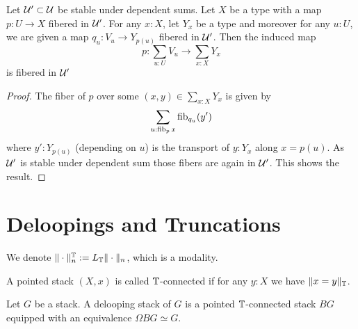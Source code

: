 \documentclass{article}
\begin{document}
\begin{lemma}{\label{lemma:AtlasSum}}
	Let $\mathcal{U}' \subset \mathcal{U}$ be stable under dependent sums.
	Let $X$ be a type with a  map $p : U \to X$ fibered in $\mathcal{U}'$.  For any $x : X$, let $Y_x$ be a type and moreover for any $u : U$, we are given a map $q_u : V_u \to Y_{p(u)}$ fibered in $\mathcal{U}'$. Then the induced map
	\[
	p : \sum_{u : U} V_u \to \sum_{x : X} Y_{x}
	\]
	is fibered in $\mathcal{U}'$
\end{lemma}
\begin{proof}
	The fiber of $p$ over some $(x,y) \in \sum_{x :X} Y_x$ is given by
	\[
	\sum_{u : \operatorname{fib}_p x} \operatorname{fib}_{q_u} (y') 
	\]
	where $y' : Y_{p(u)}$ (depending on $u$) is the transport of $y : Y_x$ along $x = p(u)$. As $\mathcal{U}'$ is stable under dependent sum %
	those fibers are again in $\mathcal{U}'$. This shows the result.
\end{proof}














\section{Deloopings and Truncations}

We denote $\| \cdot \|_n^{\mathbb{T}} := L_{\mathbb{T}} \| \cdot \|_n$, which is a modality.
\begin{definition}
	A pointed stack $(X,x)$ is called $\mathbb{T}$-connected if for any $y : X$ we have $\|x = y\|_{\mathbb{T}}$.
\end{definition}
\begin{definition}
	Let $G$ be a stack. A delooping stack of $G$ is a  pointed $\mathbb{T}$-connected stack $B G$ equipped with an equivalence $\Omega B G \simeq G$.
\end{definition}
\end{document}
